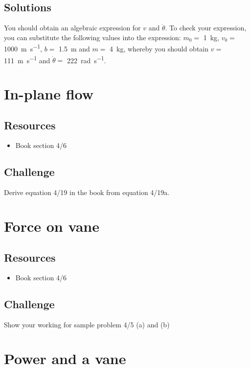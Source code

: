 \subsection*{Solutions}
You should obtain an algebraic expression for $v$ and $\dot{\theta}$. To check your expression, you can substitute the following values into the expression:
$m_0=$ \SI{1}{\kg},
$v_0=$ \SI{1000}{\meter\per\second},
$b=$ \SI{1.5}{\meter} and
$m=$ \SI{4}{\kg}, whereby you should obtain
$v=$ \SI{111}{\meter\per\second} and
$\dot{\theta}=$ \SI{222}{\radian\per\second}.




\newpage
\section{In-plane flow}

\subsection*{Resources}
\begin{itemize}
    \item Book section 4/6
\end{itemize}

\subsection*{Challenge}
Derive equation 4/19 in the book from equation 4/19a.




\newpage
\section{Force on vane}

\subsection*{Resources}
\begin{itemize}
    \item Book section 4/6
\end{itemize}

\subsection*{Challenge}
Show your working for sample problem 4/5 (a) and (b)




\newpage
\section{Power and a vane}


